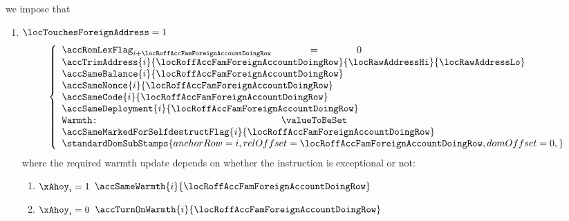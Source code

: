 \begin{description}
		we impose that
		\begin{enumerate}
			\item \If $\locTouchesForeignAddress = 1$ \Then
				\[
					\left\{ \begin{array}{lcl}
						\accRomLexFlag   _{i + \locRoffAccFamForeignAccountDoingRow} & = & 0 \\
						\multicolumn{3}{l}{\accTrimAddress
						{i}{\locRoffAccFamForeignAccountDoingRow}
						{\locRawAddressHi}
						{\locRawAddressLo}} \\
						\multicolumn{3}{l}{\accSameBalance                    {i}{\locRoffAccFamForeignAccountDoingRow}}   \\
						\multicolumn{3}{l}{\accSameNonce                      {i}{\locRoffAccFamForeignAccountDoingRow}}   \\
						\multicolumn{3}{l}{\accSameCode                       {i}{\locRoffAccFamForeignAccountDoingRow}}   \\
						\multicolumn{3}{l}{\accSameDeployment                 {i}{\locRoffAccFamForeignAccountDoingRow}}   \\
						\texttt{Warmth:} & \valueToBeSet                                                                   \\ 
						\multicolumn{3}{l}{\accSameMarkedForSelfdestructFlag  {i}{\locRoffAccFamForeignAccountDoingRow}}   \\
						\multicolumn{3}{l}{
							\standardDomSubStamps {
								anchorRow        = i                                    ,
								relOffset        = \locRoffAccFamForeignAccountDoingRow ,
								domOffset        = 0                                    ,
							}} \\
					\end{array} \right.
				\]
				where the required warmth update depends on whether the instruction is exceptional or not:
				\begin{enumerate}
					\item \If $\xAhoy _{i} = 1$ \Then $\accSameWarmth   {i}{\locRoffAccFamForeignAccountDoingRow}$
					\item \If $\xAhoy _{i} = 0$ \Then $\accTurnOnWarmth {i}{\locRoffAccFamForeignAccountDoingRow}$

\end{enumerate}
\end{enumerate}
\end{description}
